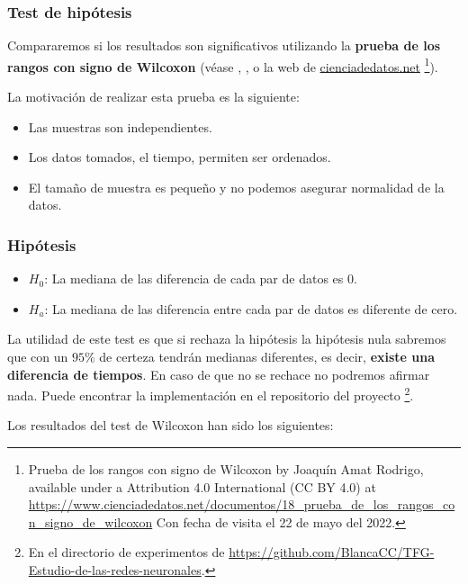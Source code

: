 \subsubsection{Test de hipótesis}

Compararemos si los resultados son significativos utilizando la \textbf{prueba de los rangos con 
signo de Wilcoxon} (véase \cite{OpenIntroStatistics}, \cite{BiologicalStatistics}, o la web de \href{https://www.cienciadedatos.net}{cienciadedatos.net} \footnote{
 Prueba de los rangos con signo de Wilcoxon by Joaquín Amat Rodrigo, available under a Attribution 4.0 International (CC BY 4.0) at
  \url{https://www.cienciadedatos.net/documentos/18_prueba_de_los_rangos_con_signo_de_wilcoxon}
  Con fecha de visita el 22 de mayo del 2022.
  }).

  La motivación de realizar esta prueba es la siguiente: 
\begin{itemize}
    \item Las muestras son independientes.
    \item Los datos tomados, el tiempo, permiten ser ordenados. 
    \item El tamaño de muestra es pequeño y no podemos asegurar normalidad de la datos. 
\end{itemize}

\subsubsection*{Hipótesis} 

\begin{itemize}
    \item $H_0$: La mediana de las diferencia de cada par de datos es $0$. 
    \item $H_a$: La mediana de las diferencia entre cada par de datos es diferente de cero. 
\end{itemize}

La utilidad de este test es que si rechaza la hipótesis la hipótesis nula sabremos que con un $95 \%$ de certeza tendrán medianas diferentes, es decir, \textbf{existe una 
diferencia de tiempos}. En caso de que no se rechace no podremos afirmar nada.
Puede encontrar la implementación en el repositorio del
 proyecto \footnote{En el directorio de experimentos 
 de \url{https://github.com/BlancaCC/TFG-Estudio-de-las-redes-neuronales}.}.

 Los resultados del test de Wilcoxon han sido los siguientes: 

